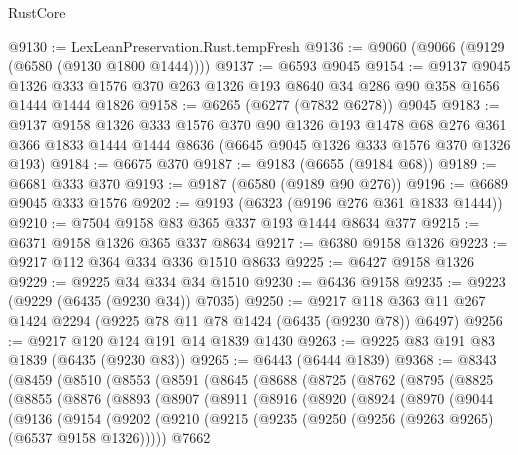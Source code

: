 \begin{lexlean}{RustCore}
\begin{coremodule}
@9130 := LexLeanPreservation.Rust.tempFresh
@9136 := @9060 (@9066 (@9129 (@6580 (@9130 @1800 @1444))))
@9137 := @6593 @9045
@9154 := @9137
    @9045
    @1326
    @333
    @1576
    @370
    @263
    @1326
    @193
    @8640
    @34
    @286
    @90
    @358
    @1656
    @1444
    @1444
    @1826
@9158 := @6265 (@6277 (@7832 @6278)) @9045
@9183 := @9137
    @9158
    @1326
    @333
    @1576
    @370
    @90
    @1326
    @193
    @1478
    @68
    @276
    @361
    @366
    @1833
    @1444
    @1444
    @8636
    (@6645 @9045 @1326 @333 @1576 @370 @1326 @193)
@9184 := @6675 @370
@9187 := @9183 (@6655 (@9184 @68))
@9189 := @6681 @333 @370
@9193 := @9187 (@6580 (@9189 @90 @276))
@9196 := @6689 @9045 @333 @1576
@9202 := @9193 (@6323 (@9196 @276 @361 @1833 @1444))
@9210 := @7504 @9158 @83 @365 @337 @193 @1444 @8634 @377
@9215 := @6371 @9158 @1326 @365 @337 @8634
@9217 := @6380 @9158 @1326
@9223 := @9217 @112 @364 @334 @336 @1510 @8633
@9225 := @6427 @9158 @1326
@9229 := @9225 @34 @334 @34 @1510
@9230 := @6436 @9158
@9235 := @9223 (@9229 (@6435 (@9230 @34)) @7035)
@9250 := @9217 @118 @363 @11 @267 @1424 @2294 (@9225 @78 @11 @78 @1424 (@6435 (@9230 @78)) @6497)
@9256 := @9217 @120 @124 @191 @14 @1839 @1430
@9263 := @9225 @83 @191 @83 @1839 (@6435 (@9230 @83))
@9265 := @6443 (@6444 @1839)
@9368 := @8343
    (@8459
      (@8510
        (@8553
          (@8591
            (@8645
              (@8688
                (@8725
                  (@8762
                    (@8795
                      (@8825
                        (@8855
                          (@8876
                            (@8893
                              (@8907
                                (@8911
                                  (@8916
                                    (@8920
                                      (@8924
                                        (@8970
                                          (@9044
                                            (@9136
                                              (@9154
                                                (@9202
                                                  (@9210
                                                    (@9215
                                                      (@9235
                                                        (@9250
                                                          (@9256
                                                            (@9263 @9265)
                                                            (@6537 @9158 @1326)))))
                                                    @7662

\end{coremodule}
\end{lexlean}
